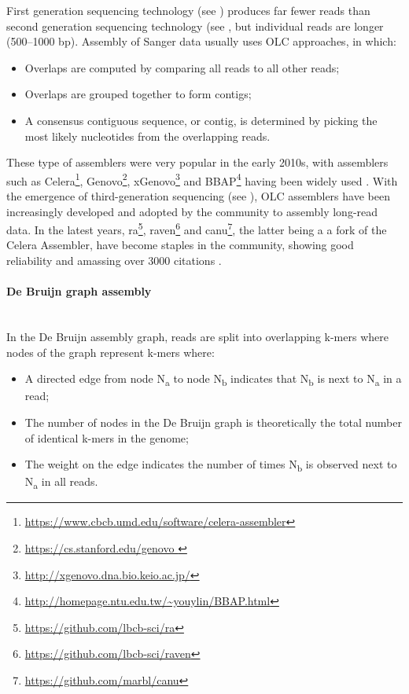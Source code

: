 First generation sequencing technology (see ) produces far fewer reads than second generation sequencing technology (see , but individual reads are longer (500–1000 \ac{bp}). 
Assembly of Sanger data usually uses \ac{OLC} approaches, in which:

\begin{itemize}
    \item Overlaps are computed by comparing all reads to all other reads;
    \item Overlaps are grouped together to form contigs;
    \item A consensus contiguous sequence, or contig, is determined by picking the most likely nucleotides from the overlapping reads.
\end{itemize}

These type of assemblers were very popular in the early 2010s, with assemblers such as Celera\footnote{\url{https://www.cbcb.umd.edu/software/celera-assembler}},  Genovo\footnote{\url{https://cs.stanford.edu/genovo }}, xGenovo\footnote{\url{http://xgenovo.dna.bio.keio.ac.jp/}} and BBAP\footnote{\url{http://homepage.ntu.edu.tw/~youylin/BBAP.html}} having been widely used \citep{myers_whole-genome_2000, hutchison_genovo_2010, afiahayati_extended_2013, lin_novo_2017}.
With the emergence of third-generation sequencing (see ), \ac{OLC} assemblers have been increasingly developed and adopted by the community to assembly long-read data. 
In the latest years, ra\footnote{\url{https://github.com/lbcb-sci/ra}}, raven\footnote{\url{https://github.com/lbcb-sci/raven}} and canu\footnote{\url{https://github.com/marbl/canu}}, the latter being a a fork of the Celera Assembler, have become staples in the community, showing good reliability and amassing over 3000 citations \citep{vaser_yet_2019, koren_canu_2017, wick_benchmarking_2021}.

\paragraph{De Bruijn graph assembly} \label{sssec:_intro_dbg_assembly} \mbox{}\\

In the De Bruijn assembly graph, reads are split into overlapping k-mers where nodes of the graph represent k-mers where:

\begin{itemize}
    \item A directed edge from node N\textsubscript{a} to node N\textsubscript{b} indicates that N\textsubscript{b} is next to N\textsubscript{a} in a read;
    \item The number of nodes in the De Bruijn graph is theoretically the total number of identical k-mers in the genome;
    \item The weight on the edge indicates the number of times  N\textsubscript{b} is observed next to  N\textsubscript{a} in all reads.
\end{itemize}

